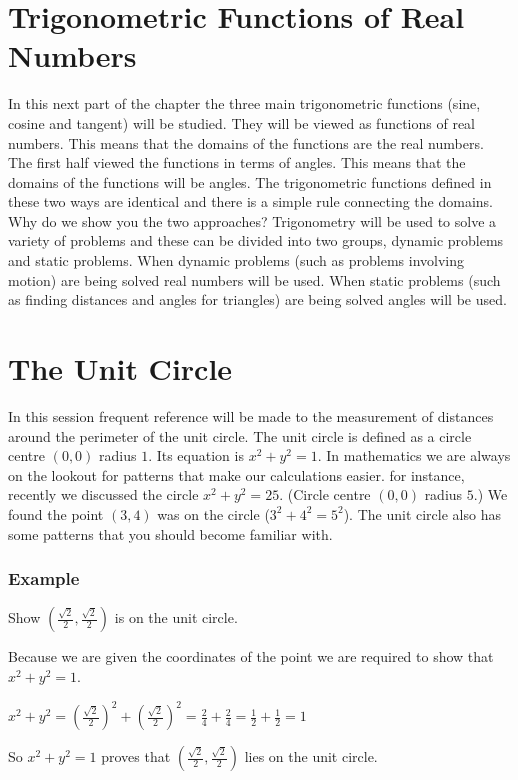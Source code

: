 \section{Trigonometric Functions of Real Numbers}
In this next part of the chapter the three main trigonometric functions (sine, cosine and tangent) will be studied. They
will be viewed as functions of real numbers. This means that the domains of the functions are the real numbers.
The first half viewed the functions in terms of angles. This
means that the domains of the functions will be angles. The trigonometric functions defined in these two ways
are identical and there is a simple rule connecting the domains. Why do we show you the two approaches? Trigonometry
will be used to solve a variety of problems and these can be divided into two groups, dynamic problems and static problems. When
dynamic problems (such as problems involving motion) are being solved real numbers will be used. When
static problems (such as finding distances and angles for triangles) are being solved angles will be used. 

\section{The Unit Circle}
In this session frequent reference will be made to the measurement of distances around the perimeter
of the unit circle. The unit circle is defined as a circle centre $\left (0 ,0\right )$ radius $1$. Its equation is $x^{2} +y^{2} =1$. In mathematics we are always on the lookout for patterns that make our calculations
easier. for instance, recently we discussed the circle $x^{2} +y^{2} =25$. (Circle centre $\left (0 ,0\right )$ radius $5$.) We found the point $\left (3 ,4\right )$ was on the circle ($3^{2} +4^{2} =5^{2}$). The unit circle also has some patterns that you should become familiar with. 

\subsubsection{Example}
Show $\left (\frac{\sqrt{2}}{2} ,\frac{\sqrt{2}}{2}\right )$ is on the unit circle. 

Because we are given
the coordinates of the point we are required to show that $x^{2} +y^{2} =1$. 

$x^{2} +y^{2} =\genfrac{(}{)}{}{}{\sqrt{2}}{2}^{2} +\genfrac{(}{)}{}{}{\sqrt{2}}{2}^{2} =\frac{2}{4} +\frac{2}{4} =\frac{1}{2} +\frac{1}{2} =1$ 

So $x^{2} +y^{2} =1$ proves that $\left (\frac{\sqrt{2}}{2} ,\frac{\sqrt{2}}{2}\right )$ lies on the unit circle. 

